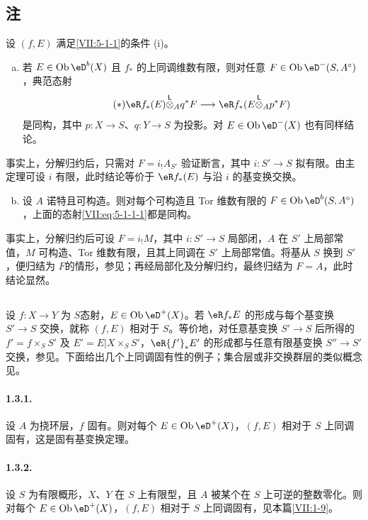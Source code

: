 \subsection{注}\label{VII:5-1-2}
设 $(f,E)$ 满足\ref{VII:5-1-1}的条件 (i)。
\begin{enumerate}[a)]
\item 若 $E\in\ob\eD^b(X)$ 且 $f_\ast$ 的上同调维数有限，则对任意 $F\in\ob\eD^-(S,A^\circ)$，典范态射
\begin{equation*}\tag{$*$}\label{VII:eq:5-1-1-1}
 \eR f_\ast(E)\lotimes_A q^\ast F\longrightarrow\eR f_\ast(E\lotimes_A p^\ast F)
\end{equation*}
是同构，其中 $p:X\to S$、$q:Y\to S$ 为投影。对 $E\in\ob\eD^-(X)$ 也有同样结论。
\end{enumerate}
事实上，分解归约后，只需对 $F=i_!A_{S'}$ 验证断言，其中 $i:S'\to S$ 拟有限。由主定理可设 $i$ 有限，此时结论等价于 $\eR f_\ast(E)$ 与沿 $i$ 的基变换交换。
\begin{enumerate}[a)]\setcounter{enumi}{1}
\item 设 $A$ 诺特且可构造。则对每个可构造且 Tor 维数有限的 $F\in\ob\eD^b(S,A^\circ)$，上面的态射\eqref{VII:eq:5-1-1-1}都是同构。
\end{enumerate}
事实上，分解归约后可设 $F=i_!M$，其中 $i:S'\to S$ 局部闭，$A$ 在 $S'$ 上局部常值，$M$ 可构造、Tor 维数有限，且其上同调在 $S'$ 上局部常值。将基从 $S$ 换到 $S'$，便归结为 $F$的情形，参见\cite[I]{sga6}；再经局部化及分解归约，最终归结为 $F=A$，此时结论显然。
\subsection{}\label{VII:5-1-3}
设 $f:X\to Y$ 为 $S$态射，$E\in\ob\eD^+(X)$。若 $\eR f_\ast E$ 的形成与每个基变换 $S'\to S$ 交换，就称 $(f,E)$ 相对于 $S$。等价地，对任意基变换 $S'\to S$ 后所得的 $f'=f\times_SS'$ 及 $E'=E|X\times_SS'$，$\eR{f'}_\ast E'$ 的形成都与任意有限基变换 $S''\to S'$ 交换，参见\cite[XII 6.1]{sga4}。下面给出几个上同调固有性的例子；集合层或非交换群层的类似概念见\cite[XIII]{sga1}。
\paragraph*{1.3.1.}
设 $A$ 为挠环层，$f$ 固有。则对每个 $E\in\ob\eD^+(X)$，$(f,E)$ 相对于 $S$ 上同调固有，这是固有基变换定理\cite[XII 5.1]{sga4}。
\paragraph*{1.3.2.}
设 $S$ 为有限概形，$X$、$Y$ 在 $S$ 上有限型，且 $A$ 被某个在 $S$ 上可逆的整数零化。则对每个 $E\in\ob\eD^+(X)$，$(f,E)$ 相对于 $S$ 上同调固有，见本篇\ref{VII:1-9}。

